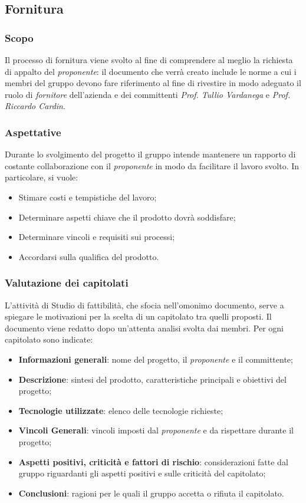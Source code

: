 \subsection{Fornitura}
\subsubsection{Scopo}
Il processo di fornitura viene svolto al fine di comprendere al meglio la richiesta di appalto del \emph{proponente}: il documento che verrà creato include le norme a cui i membri del gruppo \teamname{} devono fare riferimento al fine di rivestire in modo adeguato il ruolo di \emph{fornitore} dell'azienda \proponente{} e dei committenti \textit{Prof. Tullio Vardanega} e \textit{Prof. Riccardo Cardin}.
\subsubsection{Aspettative} %
Durante lo svolgimento del progetto il gruppo intende mantenere un rapporto di costante collaborazione con il \emph{proponente} in modo da facilitare il lavoro svolto.
In particolare, si vuole:
\begin{itemize}
	\item Stimare costi e tempistiche del lavoro;
	\item Determinare aspetti chiave che il prodotto dovrà soddisfare;
	\item Determinare vincoli e requisiti sui processi;
	\item Accordarsi sulla qualifica del prodotto.
\end{itemize}

\subsubsection{Valutazione dei capitolati}
L'attività di Studio di fattibilità, che sfocia nell'omonimo documento, serve a spiegare le motivazioni per la scelta di un capitolato tra quelli proposti.
Il documento \VdC{} viene redatto dopo un'attenta analisi svolta dai membri.
Per ogni capitolato sono indicate:
\begin{itemize}
	\item \textbf{Informazioni generali}: nome del progetto, il \emph{proponente} e il committente;
	\item \textbf{Descrizione}: sintesi del prodotto, caratteristiche principali e obiettivi del progetto;
	\item \textbf{Tecnologie utilizzate}: elenco delle tecnologie richieste;
	\item \textbf{Vincoli Generali}: vincoli imposti dal \emph{proponente} e da rispettare durante il progetto;
	\item \textbf{Aspetti positivi, criticità e fattori di rischio}: considerazioni fatte dal gruppo riguardanti gli aspetti positivi e sulle criticità del capitolato;
	\item \textbf{Conclusioni}: ragioni per le quali il gruppo accetta o rifiuta il capitolato.
\end{itemize}

